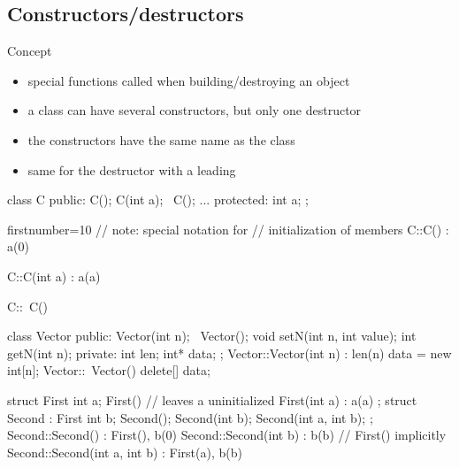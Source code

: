 \subsection[construct]{Constructors/destructors}

\begin{frame}[fragile]
  \begin{block}{Concept}
    \begin{itemize}
    \item special functions called when building/destroying an object
    \item a class can have several constructors, but only one destructor
    \item the constructors have the same name as the class
    \item same for the destructor with a leading \cppinline{~}
    \end{itemize}
  \end{block}
  \begin{multicols}{2}
    \begin{cppcode*}{}
      class C {
      public:
        C();
        C(int a);
        ~C();
        ...
      protected:
        int a;
      };
    \end{cppcode*}
    \columnbreak
    \begin{cppcode*}{firstnumber=10}
      // note: special notation for
      // initialization of members
      C::C() : a(0) {}

      C::C(int a) : a(a) {}

      C::~C() {}
    \end{cppcode*}
  \end{multicols}
\end{frame}


\begin{frame}[fragile]
  \begin{cppcode}
    class Vector {
    public:
      Vector(int n);
      ~Vector();
      void setN(int n, int value);
      int getN(int n);
    private:
      int len;
      int* data;
    };
    Vector::Vector(int n) : len(n) {
      data = new int[n];
    }
    Vector::~Vector() {
      delete[] data;
    }
  \end{cppcode}
\end{frame}

\begin{frame}[fragile]
  \begin{cppcode}
    struct First {
      int a;
      First() {} // leaves a uninitialized
      First(int a) : a(a) {}
    };
    struct Second : First {
      int b;
      Second();
      Second(int b);
      Second(int a, int b);
    };
    Second::Second() : First(), b(0) {}
    Second::Second(int b) : b(b) {} // First() implicitly
    Second::Second(int a, int b) : First(a), b(b) {}
  \end{cppcode}
\end{frame}

